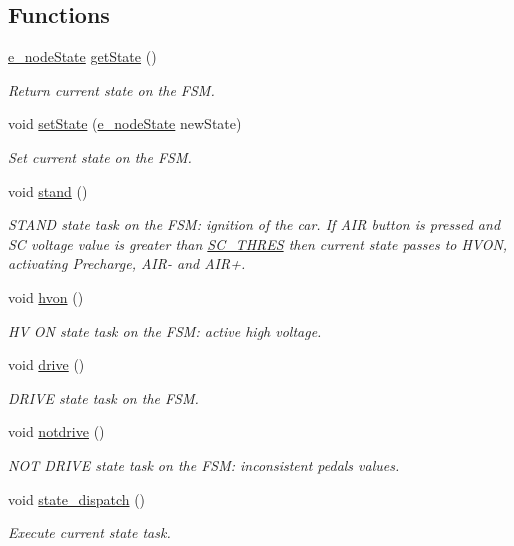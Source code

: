 \subsection*{Functions}
\begin{DoxyCompactItemize}
\item 
\mbox{\hyperlink{group__stages__group_ga29e04432d3efcac24a5ae62572a6e8f2}{e\+\_\+node\+State}} \mbox{\hyperlink{group__stages__group_ga2802a8c3f0174f4e54dd2381968212a0}{get\+State}} ()
\begin{DoxyCompactList}\small\item\em Return current state on the F\+SM. \end{DoxyCompactList}\item 
void \mbox{\hyperlink{group__stages__group_ga47cb7615bbcf2c96cc4a7656f9a76bab}{set\+State}} (\mbox{\hyperlink{group__stages__group_ga29e04432d3efcac24a5ae62572a6e8f2}{e\+\_\+node\+State}} new\+State)
\begin{DoxyCompactList}\small\item\em Set current state on the F\+SM. \end{DoxyCompactList}\item 
void \mbox{\hyperlink{group__stages__group_ga506140395cba78bffc95d77985780ca5}{stand}} ()
\begin{DoxyCompactList}\small\item\em S\+T\+A\+ND state task on the F\+SM\+: ignition of the car. If A\+IR button is pressed and SC voltage value is greater than \mbox{\hyperlink{group__stages__group_ga9688af4f17ae88b4d149269d71b7ff1f}{S\+C\+\_\+\+T\+H\+R\+ES}} then current state passes to H\+V\+ON, activating Precharge, A\+I\+R-\/ and A\+I\+R+. \end{DoxyCompactList}\item 
void \mbox{\hyperlink{group__stages__group_ga6fada8f571df828c8fe6b920e2558c37}{hvon}} ()
\begin{DoxyCompactList}\small\item\em HV ON state task on the F\+SM\+: active high voltage. \end{DoxyCompactList}\item 
void \mbox{\hyperlink{group__stages__group_ga928e32686c7e00c1ecde24c3da3019f7}{drive}} ()
\begin{DoxyCompactList}\small\item\em D\+R\+I\+VE state task on the F\+SM. \end{DoxyCompactList}\item 
void \mbox{\hyperlink{group__stages__group_ga3ac5d1576c7d3ef76c2dfe724d4849fa}{notdrive}} ()
\begin{DoxyCompactList}\small\item\em N\+OT D\+R\+I\+VE state task on the F\+SM\+: inconsistent pedals values. \end{DoxyCompactList}\item 
void \mbox{\hyperlink{group__stages__group_gac534eb879fa26941a06ffadeb69d92ff}{state\+\_\+dispatch}} ()
\begin{DoxyCompactList}\small\item\em Execute current state task. \end{DoxyCompactList}\end{DoxyCompactItemize}

